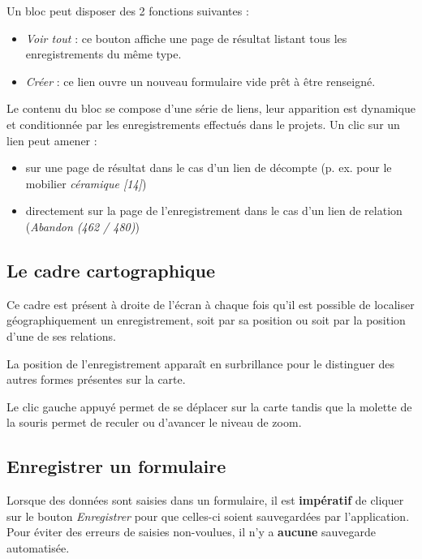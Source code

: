 \documentclass[letterpaper,10pt,french]{sphinxmanual}
\begin{document}
Un bloc peut disposer des 2 fonctions suivantes :
\begin{itemize}
\item {} 
\emph{Voir tout} : ce bouton affiche une page de résultat listant tous les enregistrements du même type.

\item {} 
\emph{Créer} : ce lien ouvre un nouveau formulaire vide prêt à être renseigné.

\end{itemize}

Le contenu du bloc se compose d'une série de liens, leur apparition est dynamique et conditionnée par les enregistrements effectués dans le projets. Un clic sur un lien peut amener :
\begin{itemize}
\item {} 
sur une page de résultat dans le cas d'un lien de décompte (p. ex. pour le mobilier \emph{céramique {[}14{]}})

\item {} 
directement sur la page de l'enregistrement dans le cas d'un lien de relation (\emph{Abandon (462 / 480)})

\end{itemize}


\subsection{Le cadre cartographique}
\label{manuel/interface:le-cadre-cartographique}
Ce cadre est présent à droite de l'écran à chaque fois qu'il est possible de localiser géographiquement un enregistrement, soit par sa position ou soit par la position d'une de ses relations.

La position de l'enregistrement apparaît en surbrillance pour le distinguer des autres formes présentes sur la carte.

Le clic gauche appuyé permet de se déplacer sur la carte tandis que la molette de la souris permet de reculer ou d'avancer le niveau de zoom.


\subsection{Enregistrer un formulaire}
\label{manuel/interface:enregistrer-un-formulaire}
Lorsque des données sont saisies dans un formulaire, il est \textbf{impératif} de cliquer sur le bouton \emph{Enregistrer} pour que celles-ci soient sauvegardées par l'application. Pour éviter des erreurs de saisies non-voulues, il n'y a \textbf{aucune} sauvegarde automatisée.
\end{document}
